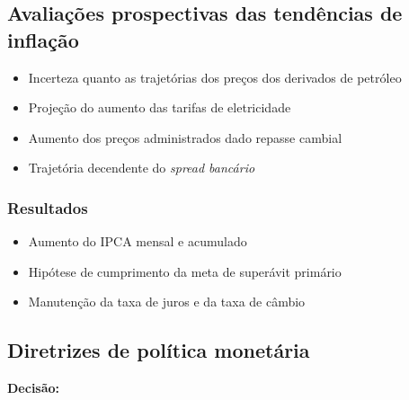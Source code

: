 \documentclass[11pt]{article}
\begin{document}
\subsection*{Avaliações prospectivas das tendências de inflação}
\label{sec:orgab61186}
\begin{itemize}
\item Incerteza quanto as trajetórias dos preços dos derivados de petróleo
\item Projeção do aumento das tarifas de eletricidade
\item Aumento dos preços administrados dado repasse cambial
\item Trajetória decendente do \emph{spread bancário}
\end{itemize}


\subsubsection*{Resultados}
\label{sec:orgde8e298}

\begin{itemize}
\item Aumento do IPCA mensal e acumulado
\item Hipótese de cumprimento da meta de superávit primário
\item Manutenção da taxa de juros e da taxa de câmbio
\end{itemize}
\subsection*{Diretrizes de política monetária}
\label{sec:orgae4b9c7}
\textbf{Decisão:} 
\end{document}
